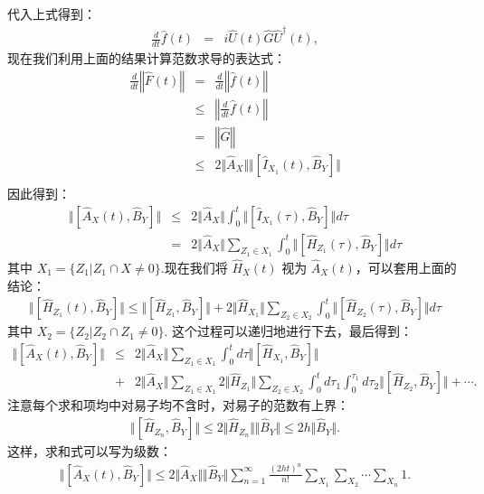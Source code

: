 \documentclass[10pt,UTF8]{ctexart}
\begin{document}
代入上式得到：
\begin{eqnarray}
	\frac{d}{dt}\hat{f}(t) 
	&=& i \hat{U}(t)\hat{G}\hat{U}^{\dagger}(t),
\end{eqnarray}
现在我们利用上面的结果计算范数求导的表达式：
\begin{eqnarray}
	\frac{d}{dt} \left\Vert \hat{F}(t) \right\Vert 
	&=& \frac{d}{dt} \left\Vert \hat{f}(t) \right\Vert  \nonumber \\
	&\le & \left\Vert \frac{d}{dt}\hat{f}(t) \right\Vert  \nonumber \\
	&=& \left\Vert \hat G \right\Vert \nonumber \\
	&\le & 2\Vert \hat{A}_X \Vert \Vert [\hat{I}_{X_1}(t), \hat B_Y] \Vert \nonumber \\
\end{eqnarray}
因此得到：
\begin{eqnarray}
	\Vert [\hat{A}_X(t), \hat B_Y] \Vert 
	&\le & 2 \Vert \hat{A}_X \Vert \int_0^t \Vert [\hat{I}_{X_1}(\tau), \hat B_Y] \Vert d\tau \nonumber \\
	&=& 2 \Vert \hat{A}_X \Vert \sum_{Z_1 \in X_1} \int_0^t \Vert [\hat{H}_{Z_1}(\tau), \hat B_Y] \Vert d\tau
\end{eqnarray}
其中 $X_1 = \{Z_1|Z_1 \cap X \ne 0\}$.现在我们将 $\hat{H}_{X}(t)$ 视为 $\hat A_X(t)$，可以套用上面的结论：
\begin{eqnarray}
	\Vert [\hat{H}_{Z_1}(t), \hat B_Y] \Vert
	\le \Vert [\hat{H}_{Z_1}, \hat B_Y] \Vert + 2\Vert\hat{H}_{X_1}\Vert \sum_{Z_2 \in X_2} \int_0^t \Vert [\hat{H}_{Z_2}(\tau), \hat B_Y] \Vert d\tau
\end{eqnarray}
其中 $X_2 = \{Z_2|Z_2 \cap Z_1 \ne 0\}$. 这个过程可以递归地进行下去，最后得到：
\begin{eqnarray}
	\Vert [\hat{A}_X(t), \hat B_Y] \Vert
	&\le & 2 \Vert \hat{A}_X \Vert \sum_{Z_1\in X_1} \int_0^t d\tau \Vert [\hat{H}_{X_1}, \hat B_Y] \Vert \nonumber \\
	& + & 2 \Vert \hat{A}_X \Vert \sum_{Z_1 \in X_1} 2 \Vert \hat{H}_{Z_1} \Vert \sum_{Z_2 \in X_2} \int_0^t d\tau_1\int_0^{\tau_1} d\tau_2 \Vert [\hat{H}_{Z_2}, \hat B_Y] \Vert + \cdots.
\end{eqnarray}
注意每个求和项均中对易子均不含时，对易子的范数有上界：
\begin{eqnarray}
	\Vert[\hat{H}_{Z_n},\hat{B}_{Y}]\Vert \le 2 \Vert \hat{H}_{Z_n} \Vert \Vert \hat{B}_{Y} \Vert \le 2h \Vert \hat{B}_{Y} \Vert.
\end{eqnarray}
这样，求和式可以写为级数：
\begin{eqnarray}
	\Vert [\hat{A}_X(t), \hat B_Y] \Vert 
	\le 2\Vert \hat{A}_X \Vert \Vert\hat{B}_Y\Vert \sum_{n=1}^{\infty} \frac{(2ht)^n}{n!} \sum_{X_1} \sum_{X_2} \cdots \sum_{X_n} 1.
\end{eqnarray}
\end{document}
